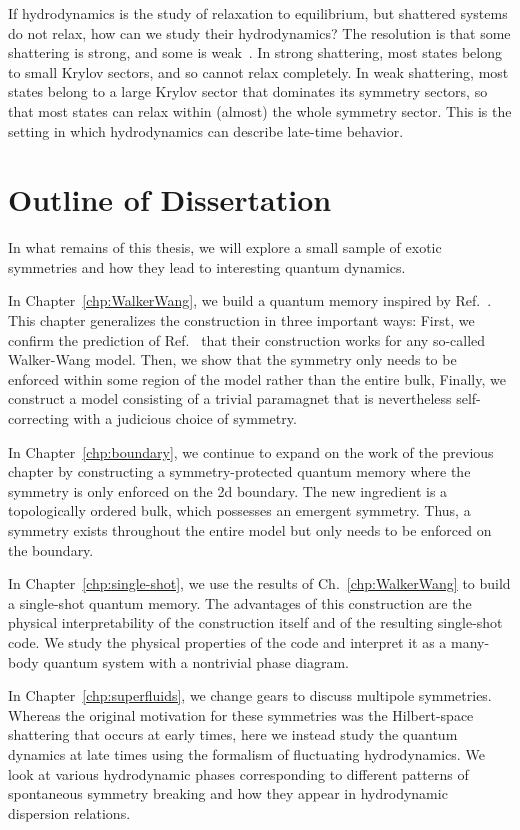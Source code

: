 If hydrodynamics is the study of relaxation to equilibrium, but shattered systems do not relax, how can we study their hydrodynamics? The resolution is that some shattering is strong, and some is weak~\cite{Khemani2020Localization, Sala2020Fragmentation}. In strong shattering, most states belong to small Krylov sectors, and so cannot relax completely. In weak shattering, most states belong to a large Krylov sector that dominates its symmetry sectors, so that most states can relax within (almost) the whole symmetry sector. This is the setting in which hydrodynamics can describe late-time behavior.

\section{Outline of Dissertation}

In what remains of this thesis, we will explore a small sample of exotic symmetries and how they lead to interesting quantum dynamics.

In Chapter~\ref{chp:WalkerWang}, we build a quantum memory inspired by Ref.~\cite{RobertsBartlett2020}. This chapter generalizes the  construction in three important ways: First, we confirm the prediction of Ref.~\cite{RobertsBartlett2020} that their construction works for any so-called Walker-Wang model. Then, we show that the symmetry only needs to be enforced within some region of the model rather than the entire bulk, Finally, we construct a model consisting of a trivial paramagnet that is nevertheless self-correcting with a judicious choice of symmetry.

In Chapter~\ref{chp:boundary}, we continue to expand on the work of the previous chapter by constructing a symmetry-protected quantum memory where the symmetry is only enforced on the 2d boundary. The new ingredient is a topologically ordered bulk, which possesses an emergent symmetry. Thus, a symmetry exists throughout the entire model but only needs to be enforced on the boundary. 

In Chapter~\ref{chp:single-shot}, we use the results of Ch.~\ref{chp:WalkerWang} to build a single-shot quantum memory. The advantages of this construction are the physical interpretability of the construction itself and of the resulting single-shot code. We study the physical properties of the code and interpret it as a many-body quantum system with a nontrivial phase diagram.

In Chapter~\ref{chp:superfluids}, we change gears to discuss multipole symmetries. Whereas the original motivation for these symmetries was the Hilbert-space shattering that occurs at early times, here we instead study the quantum dynamics at late times using the formalism of fluctuating hydrodynamics. We look at various hydrodynamic phases corresponding to different patterns of spontaneous symmetry breaking and how they appear in hydrodynamic dispersion relations. 

